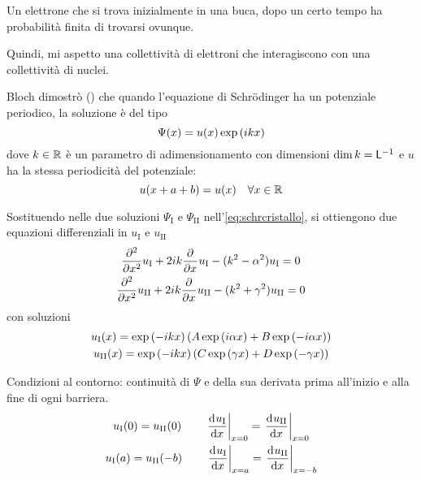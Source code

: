 Un elettrone che si trova inizialmente in una buca, dopo un certo tempo ha probabilità finita di trovarsi ovunque.

Quindi, mi aspetto una collettività di elettroni che interagiscono con una collettività di nuclei.

Bloch dimostrò () che quando l'equazione di Schrödinger ha un potenziale periodico, la soluzione è del tipo
\begin{equation}
\label{eq:bloch}
    \Psi(x) = u(x) \operatorname{exp}\left( i k x \right)
\end{equation}
dove $k \in \mathbb{R}$ è un parametro di adimensionamento con dimensioni $\operatorname{dim}{k} = \mathsf{L}^{-1}$ e $u$ ha la stessa periodicità del potenziale:
\begin{equation}
    u(x + a + b) = u(x) \quad \forall x \in \mathbb{R}
\end{equation}

Sostituendo nelle due soluzioni $\Psi_\mathrm{I}$ e $\Psi_\mathrm{II}$ nell'\cref{eq:schrcristallo}, si ottiengono due equazioni differenziali in $u_\mathrm{I}$ e $u_\mathrm{II}$
\begin{subequations}
    \begin{gather}
        \parder[][2]{x} u_\mathrm{I} + 2\im k \parder{x} u_\mathrm{I} - (k^2 - \alpha^2) u_\mathrm{I} = 0 \\
        \parder[][2]{x} u_\mathrm{II} + 2\im k \parder{x} u_\mathrm{II} - (k^2 + \gamma^2) u_\mathrm{II} = 0
    \end{gather}
\end{subequations}
con soluzioni
\begin{subequations}
    \begin{gather}
        u_\mathrm{I}(x) = \operatorname{exp}\left( -i k x \right) \left( A \operatorname{exp}\left( i \alpha x \right) + B \operatorname{exp}\left( -i \alpha x \right) \right) \\
        u_\mathrm{II}(x) = \operatorname{exp}\left( -i k x \right) \left( C \operatorname{exp}\left( \gamma x \right) + D \operatorname{exp}\left( -\gamma x \right) \right)
    \end{gather}
\end{subequations}

Condizioni al contorno: continuità di $\Psi$ e della sua derivata prima all'inizio e alla fine di ogni barriera.
\begin{subequations}
    \begin{gather}
        u_\mathrm{I}(0) = u_\mathrm{II}(0) \qquad
        \evalat{\der[u_\mathrm{I}]{x}}{x = 0} = \evalat{\der[u_\mathrm{II}]{x}}{x = 0} \\
    \label{eq:boundaryuii}
        u_\mathrm{I}(a) = u_\mathrm{II}(-b) \qquad
        \evalat{\der[u_\mathrm{I}]{x}}{x = a} = \evalat{\der[u_\mathrm{II}]{x}}{x = -b}
    \end{gather}
\end{subequations}

